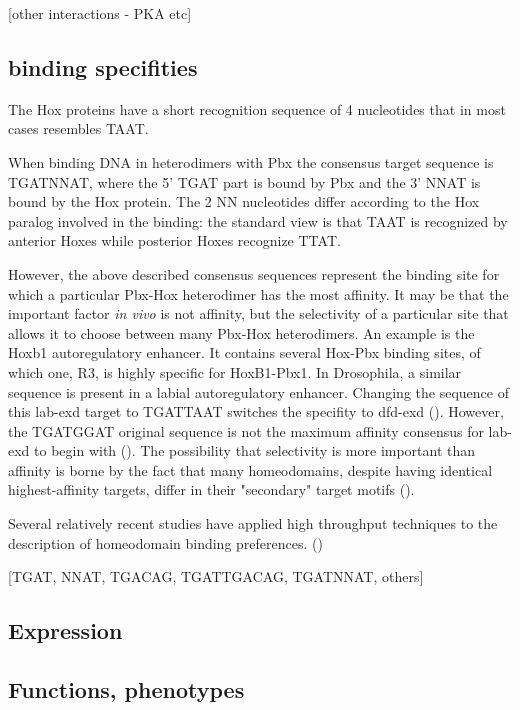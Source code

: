 		[other interactions - PKA etc]

\subsection{binding specifities}
		
		The Hox proteins have a short recognition sequence of 4 nucleotides that in most cases resembles TAAT. 
		
		When binding DNA in heterodimers with Pbx the consensus target sequence is TGATNNAT, where the 5' TGAT part is bound by Pbx and the 3' NNAT is bound by the Hox protein. The 2 NN nucleotides differ according to the Hox paralog involved in the binding: the standard view is that TAAT is recognized by anterior Hoxes while posterior Hoxes recognize TTAT.
		
		However, the above described consensus sequences represent the binding site for which a particular Pbx-Hox heterodimer has the most affinity. It may be that the important factor \textit{in vivo} is not affinity, but the selectivity of a particular site that allows it to choose between many Pbx-Hox heterodimers. An example is the Hoxb1 autoregulatory enhancer. It contains several Hox-Pbx binding sites, of which one, R3, is highly specific for HoxB1-Pbx1. In Drosophila, a similar sequence is present in a labial autoregulatory enhancer. Changing the sequence of this lab-exd target to TGATTAAT switches the specifity to dfd-exd (\cite{Chan1997}). However, the TGATGGAT original sequence is not the maximum affinity consensus for lab-exd to begin with (\cite{Mann1998}). The possibility that selectivity is more important than affinity is borne by the fact that many homeodomains, despite having identical highest-affinity targets, differ in their "secondary" target motifs (\cite{Berger2008}).
		
		Several relatively recent studies have applied high throughput techniques to the description of homeodomain binding preferences. (\cite{Slattery2011,Berger2008,Noyes2008})
		
		[TGAT, NNAT, TGACAG, TGATTGACAG, TGATNNAT, others]



\subsection{Expression}
\subsection{Functions, phenotypes}

